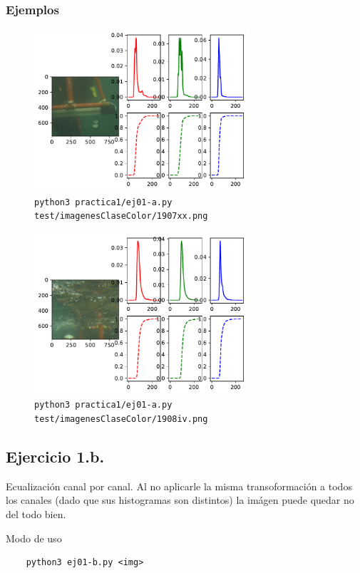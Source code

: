 \documentclass[11pt, spanish]{article}
\begin{document}
\subsubsection*{Ejemplos}
\begin{figure}[H]
\centering
  \includegraphics[height=6cm]{informe-imgs/ej01-a-1.pdf}
  \caption{\texttt{python3 practica1/ej01-a.py test/imagenesClaseColor/1907xx.png}}
\end{figure}
\begin{figure}[H]
\centering
  \includegraphics[height=6cm]{informe-imgs/ej01-a-2.pdf}
  \caption{\texttt{python3 practica1/ej01-a.py test/imagenesClaseColor/1908iv.png}}
\end{figure}


\subsection{Ejercicio 1.b.}

Ecualización canal por canal.
Al no aplicarle la misma transoformación a todos los canales (dado que sus histogramas son distintos)
la imágen puede quedar no del todo bien.

Modo de uso
\begin{verbatim}
    python3 ej01-b.py <img>
\end{verbatim}
\end{document}
